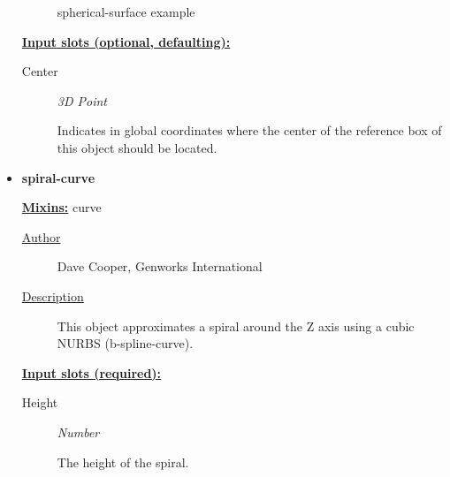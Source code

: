 \documentclass [11pt]{book}
\begin{document}
\begin{itemize}
\begin{figure}
\caption{spherical-surface example}

\label{fig:spherical-surface}

\end{figure}





\textbf{
\underline{Input slots (optional, defaulting):}}

\begin{description}

\item [Center]
\emph{3D Point}

 Indicates in global coordinates where the center of the reference
box of this object should be located.




\end{description}







\item {}
\label{prim:spiral-curve}
\textbf{spiral-curve}


\textbf{
\underline{Mixins:}} curve





\begin{description}

\item [
\underline{Author}]


Dave Cooper, Genworks International



\item [
\underline{Description}]


This object approximates a spiral around the Z axis using a cubic NURBS (b-spline-curve).



\end{description}








\textbf{
\underline{Input slots (required):}}

\begin{description}

\item [Height]
\emph{Number}

 The height of the spiral.





\end{description}
\end{itemize}
\end{document}
